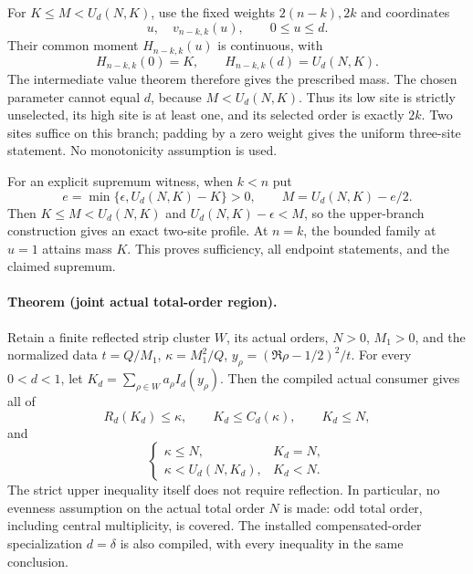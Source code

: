 For \(K\le M<U_d(N,K)\), use the fixed weights
\(2(n-k),2k\) and coordinates
\[
 u,\quad v_{n-k,k}(u),\qquad 0\le u\le d.
\]
Their common moment \(H_{n-k,k}(u)\) is continuous, with
\[
 H_{n-k,k}(0)=K,\qquad H_{n-k,k}(d)=U_d(N,K).
\]
The intermediate value theorem therefore gives the prescribed mass.
The chosen parameter cannot equal \(d\), because \(M<U_d(N,K)\).
Thus its low site is strictly unselected, its high site is at least one,
and its selected order is exactly \(2k\).  Two sites suffice on this
branch; padding by a zero weight gives the uniform three-site statement.
No monotonicity assumption is used.

For an explicit supremum witness, when \(k<n\) put
\[
 e=\min\{\epsilon,U_d(N,K)-K\}>0,\qquad
 M=U_d(N,K)-e/2.
\]
Then \(K\le M<U_d(N,K)\) and \(U_d(N,K)-\epsilon<M\), so the
upper-branch construction gives an exact two-site profile.
At \(n=k\), the bounded family at \(u=1\) attains mass \(K\).
This proves sufficiency, all endpoint statements, and the claimed supremum.

\paragraph{Theorem (joint actual total-order region).}
Retain a finite reflected strip cluster \(W\), its actual orders,
\(N>0\), \(M_1>0\), and the normalized data
\(t=Q/M_1\), \(\kappa=M_1^2/Q\), \(y_\rho=(\Re\rho-1/2)^2/t\).
For every \(0<d<1\), let \(K_d=\sum_{\rho\in W}a_\rho I_d(y_\rho)\).
Then the compiled actual consumer gives all of
\begin{equation}
 R_d(K_d)\le\kappa,\qquad K_d\le C_d(\kappa),\qquad K_d\le N,
 \label{eq:actual-total-region-counts}
\end{equation}
and
\begin{equation}
 \begin{cases}
 \kappa\le N,&K_d=N,\\
 \kappa<U_d(N,K_d),&K_d<N.
 \end{cases}
 \label{eq:actual-total-region-upper}
\end{equation}
The strict upper inequality itself does not require reflection.
In particular, no evenness assumption on the actual total order \(N\)
is made: odd total order, including central multiplicity, is covered.
The installed compensated-order specialization \(d=\delta\) is also
compiled, with every inequality in the same conclusion.

